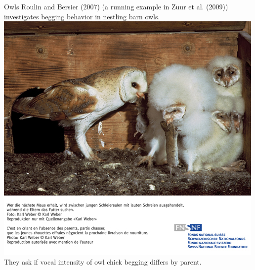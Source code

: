 \documentclass[
  ignorenonframetext,
]{beamer}
\begin{document}
\begin{frame}{Owls}
\protect\hypertarget{owls}{}
Roulin and Bersier (2007) (a running example in Zuur et al. (2009))
investigates begging behavior in nestling barn owls.
\includegraphics[width=\textwidth,height=0.7\textheight]{../images/owls.jpg}
They ask if vocal intensity of owl chick begging differs by parent.
\end{frame}
\end{document}
